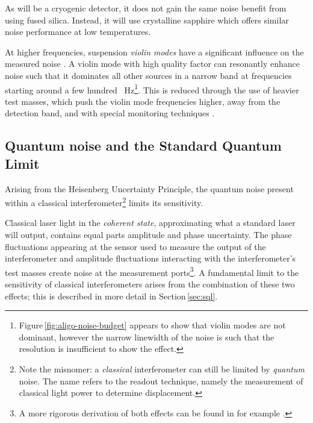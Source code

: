 As \KAGRA{} will be a cryogenic detector, it does not gain the same noise benefit from using fused silica. Instead, it will use crystalline sapphire which offers similar noise performance at low temperatures.

At higher frequencies, suspension \emph{violin modes} have a significant influence on the measured noise \cite{Robertson2002}. A violin mode with high quality factor can resonantly enhance noise such that it dominates all other sources in a narrow band at frequencies starting around a few hundred \SI{}{\hertz}\footnote{Figure\,\ref{fig:aligo-noise-budget} appears to show that violin modes are not dominant, however the narrow linewidth of the noise is such that the resolution is insufficient to show the effect.}. This is reduced through the use of heavier test masses, which push the violin mode frequencies higher, away from the detection band, and with special monitoring techniques \cite{Sorazu2010}.

\subsection{\label{sec:quantum-noise}Quantum noise and the Standard Quantum Limit}
Arising from the Heisenberg Uncertainty Principle, the quantum noise present within a classical interferometer\footnote{Note the misnomer: a \emph{classical} interferometer can still be limited by \emph{quantum} noise. The name refers to the readout technique, namely the measurement of classical light power to determine displacement.} limits its sensitivity.

Classical laser light in the \emph{coherent state}, approximating what a standard laser will output, contains equal parts amplitude and phase uncertainty. The phase fluctuations appearing at the sensor used to measure the output of the interferometer and amplitude fluctuations interacting with the interferometer's test masses create noise at the measurement ports\footnote{A more rigorous derivation of both effects can be found in for example \cite{Danilishin2012}.}. A fundamental limit to the sensitivity of classical interferometers arises from the combination of these two effects; this is described in more detail in Section\,\ref{sec:sql}.

